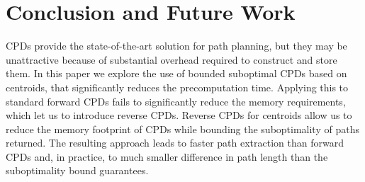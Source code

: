 \section{Conclusion and Future Work}
\label{sec:conclusion}

CPDs provide the state-of-the-art solution for path planning, 
but they may be unattractive because of substantial overhead required to construct and store them.
In this paper we explore the use of bounded suboptimal CPDs
based on centroids, 
that significantly reduces the precomputation time.
Applying this to standard forward CPDs fails to significantly reduce the memory requirements, which let us to introduce reverse CPDs.  
Reverse CPDs for centroids allow us to reduce the memory footprint of CPDs while bounding the suboptimality of paths returned. The resulting approach leads to faster path extraction than forward 
CPDs and, in practice, to much smaller difference in path length than the suboptimality bound guarantees. 
